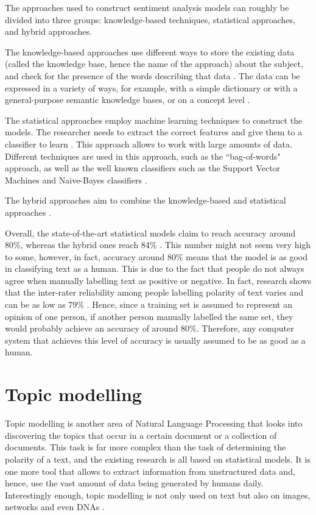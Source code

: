 The approaches used to construct sentiment analysis models can roughly be divided into three groups: knowledge-based techniques, statistical approaches, and hybrid approaches. 

The knowledge-based approaches use different ways to store the existing data (called the knowledge base, hence the name of the approach) about the subject, and check for the presence of the words describing that data \cite{chaumartin2007upar7}. The data can be expressed in a variety of ways, for example, with a simple dictionary or with a general-purpose semantic knowledge bases, or on a concept level \cite{cambria2013knowledge}. 

The statistical approaches employ machine learning techniques to construct the models. The researcher needs to extract the correct features and give them to a classifier to learn \cite{cambria2013statistical}. This approach allows to work with large amounts of data. Different techniques are used in this approach, such as the ``bag-of-words" approach, as well as the well known classifiers such as the Support Vector Machines and Naive-Bayes classifiers \cite{mullen2004sentiment, tan2009adapting}.

The hybrid approaches aim to combine the knowledge-based and statistical approaches \cite{ghiassi2013twitter}. 

Overall, the state-of-the-art statistical models claim to reach accuracy around 80\%, whereas the hybrid ones reach 84\% \cite{thakkar2015approaches}. This number might not seem very high to some, however, in fact, accuracy around 80\% means that the model is as good in classifying text as a human. This is due to the fact that people do not always agree when manually labelling text as positive or negative. In fact, research shows that the inter-rater reliability among people labelling polarity of text varies and can be as low as 79\% \cite{bloom2007extracting}. Hence, since a training set is assumed to represent an opinion of one person, if another person manually labelled the same set, they would probably achieve an accuracy of around 80\%. Therefore, any computer system that achieves this level of accuracy is usually assumed to be as good as a human.

\section{Topic modelling}
\label{sec:topic_modelling}

Topic modelling is another area of Natural Language Processing that looks into discovering the topics that occur in a certain document or a collection of documents. This task is far more complex than the task of determining the polarity of a text, and the existing research is all based on statistical models. It is one more tool that allows to extract information from unstructured data and, hence, use the vast amount of data being generated by humans daily. Interestingly enough, topic modelling is not only used on text but also on images, networks and even DNAs \cite{liu2007unsupervised, chang2009relational, lau2013collocations}. 

